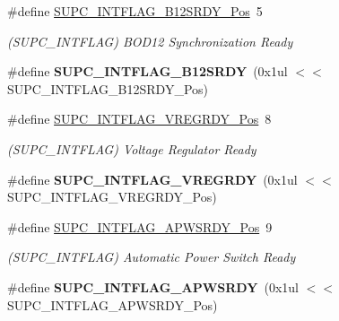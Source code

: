 \begin{DoxyCompactItemize}
\item 
\hypertarget{group___s_a_m_l21___s_u_p_c_ga34c8396b4c5d65a45964959329989efa}{}\#define \hyperlink{group___s_a_m_l21___s_u_p_c_ga34c8396b4c5d65a45964959329989efa}{S\+U\+P\+C\+\_\+\+I\+N\+T\+F\+L\+A\+G\+\_\+\+B12\+S\+R\+D\+Y\+\_\+\+Pos}~5\label{group___s_a_m_l21___s_u_p_c_ga34c8396b4c5d65a45964959329989efa}

\begin{DoxyCompactList}\small\item\em (S\+U\+P\+C\+\_\+\+I\+N\+T\+F\+L\+A\+G) B\+O\+D12 Synchronization Ready \end{DoxyCompactList}\item 
\hypertarget{group___s_a_m_l21___s_u_p_c_ga8715717fc6314f83aa010e82b1d721fc}{}\#define {\bfseries S\+U\+P\+C\+\_\+\+I\+N\+T\+F\+L\+A\+G\+\_\+\+B12\+S\+R\+D\+Y}~(0x1ul $<$$<$ S\+U\+P\+C\+\_\+\+I\+N\+T\+F\+L\+A\+G\+\_\+\+B12\+S\+R\+D\+Y\+\_\+\+Pos)\label{group___s_a_m_l21___s_u_p_c_ga8715717fc6314f83aa010e82b1d721fc}

\item 
\hypertarget{group___s_a_m_l21___s_u_p_c_ga21172349ab663fd4936c424e182852c4}{}\#define \hyperlink{group___s_a_m_l21___s_u_p_c_ga21172349ab663fd4936c424e182852c4}{S\+U\+P\+C\+\_\+\+I\+N\+T\+F\+L\+A\+G\+\_\+\+V\+R\+E\+G\+R\+D\+Y\+\_\+\+Pos}~8\label{group___s_a_m_l21___s_u_p_c_ga21172349ab663fd4936c424e182852c4}

\begin{DoxyCompactList}\small\item\em (S\+U\+P\+C\+\_\+\+I\+N\+T\+F\+L\+A\+G) Voltage Regulator Ready \end{DoxyCompactList}\item 
\hypertarget{group___s_a_m_l21___s_u_p_c_gabff73db59e317d2d7df11152b80643a0}{}\#define {\bfseries S\+U\+P\+C\+\_\+\+I\+N\+T\+F\+L\+A\+G\+\_\+\+V\+R\+E\+G\+R\+D\+Y}~(0x1ul $<$$<$ S\+U\+P\+C\+\_\+\+I\+N\+T\+F\+L\+A\+G\+\_\+\+V\+R\+E\+G\+R\+D\+Y\+\_\+\+Pos)\label{group___s_a_m_l21___s_u_p_c_gabff73db59e317d2d7df11152b80643a0}

\item 
\hypertarget{group___s_a_m_l21___s_u_p_c_gaa97971284f80872de0cabd760362b895}{}\#define \hyperlink{group___s_a_m_l21___s_u_p_c_gaa97971284f80872de0cabd760362b895}{S\+U\+P\+C\+\_\+\+I\+N\+T\+F\+L\+A\+G\+\_\+\+A\+P\+W\+S\+R\+D\+Y\+\_\+\+Pos}~9\label{group___s_a_m_l21___s_u_p_c_gaa97971284f80872de0cabd760362b895}

\begin{DoxyCompactList}\small\item\em (S\+U\+P\+C\+\_\+\+I\+N\+T\+F\+L\+A\+G) Automatic Power Switch Ready \end{DoxyCompactList}\item 
\hypertarget{group___s_a_m_l21___s_u_p_c_ga3ef338373c2586c904fb89a880980c68}{}\#define {\bfseries S\+U\+P\+C\+\_\+\+I\+N\+T\+F\+L\+A\+G\+\_\+\+A\+P\+W\+S\+R\+D\+Y}~(0x1ul $<$$<$ S\+U\+P\+C\+\_\+\+I\+N\+T\+F\+L\+A\+G\+\_\+\+A\+P\+W\+S\+R\+D\+Y\+\_\+\+Pos)\label{group___s_a_m_l21___s_u_p_c_ga3ef338373c2586c904fb89a880980c68}


\end{DoxyCompactItemize}
